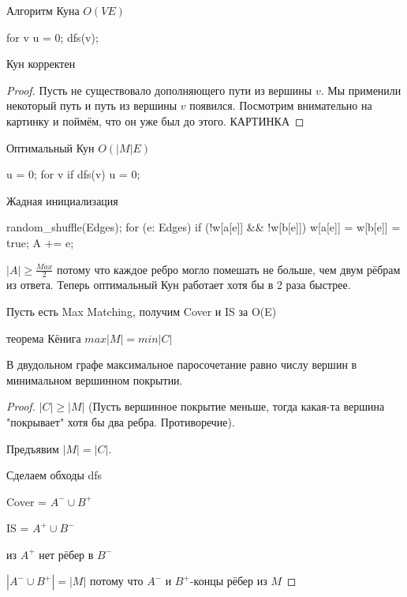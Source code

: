 Алгоритм Куна $O(VE)$
\begin{cppcode}
for v {
	u = 0;
	dfs(v);
}
\end{cppcode}
\begin{theorem}
Кун корректен
\end{theorem}
\begin{proof}
Пусть не существовало дополняющего пути из вершины $v$. Мы применили некоторый путь и путь из вершины $v$ появился. Посмотрим внимательно на картинку и поймём, что он уже был до этого.
КАРТИНКА
\end{proof}
Оптимальный Кун $O(|M|E)$
\begin{cppcode}
u = {0};
for v {
	if dfs(v) {
		u = {0};
	}
}
\end{cppcode}
Жадная инициализация
\begin{cppcode}
random_shuffle(Edges);
for (e: Edges) {
	if (!w[a[e]] && !w[b[e]]) {
		w[a[e]] = w[b[e]] = true;
		A += {e};
	}
}
\end{cppcode}
$|A| \ge \frac{Max}{2}$ потому что каждое ребро могло помешать не больше, чем двум рёбрам из ответа. Теперь оптимальный Кун работает хотя бы в 2 раза быстрее.

Пусть есть Max Matching, получим Cover и IS за O(E)
\begin{theorem}{теорема Кёнига}
$max |M| = min |C|$

В двудольном графе максимальное паросочетание равно числу вершин в минимальном вершинном покрытии.
\end{theorem}
\begin{proof}
$|C| \ge |M|$ (Пусть вершинное покрытие меньше, тогда какая-та вершина "покрывает" хотя бы два ребра. Противоречие).

Предъявим $|M| = |C|$.

Сделаем обходы dfs

Cover = $A^- \cup B^+$

IS = $A^+ \cup B^-$
\item из $A^+$ нет рёбер в $B^-$
\item $|A^- \cup B^+| = |M|$ потому что $A^-$ и $B^+$-концы рёбер из $M$
\end{proof}